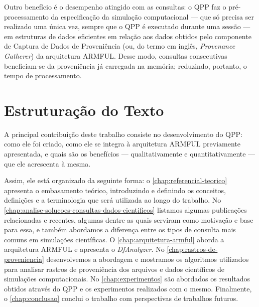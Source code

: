 Outro benefício é o desempenho atingido com as consultas: o QPP faz o pré-processamento da especificação da simulação computacional --- que só precisa ser realizado uma única vez, sempre que o QPP é executado durante uma sessão --- em estruturas de dados eficientes em relação aos dados obtidos pelo componente de Captura de Dados de Proveniência (ou, do termo em inglês, \textit{Provenance Gatherer}) da arquitetura ARMFUL. Desse modo, consultas consecutivas beneficiam-se da proveniência já carregada na memória; reduzindo, portanto, o tempo de processamento.

\section{Estruturação do Texto}

A principal contribuição deste trabalho consiste no desenvolvimento do QPP: como ele foi criado, como ele se integra à arquitetura ARMFUL previamente apresentada, e quais são os benefícios --- qualitativamente e quantitativamente --- que ele acrescenta à mesma.

Assim, ele está organizado da seguinte forma:
o \autoref{chap:referencial-teorico} apresenta o embasamento teórico, introduzindo e definindo os conceitos, definições e a terminologia que será utilizada ao longo do trabalho.
No \autoref{chap:analise-solucoes-consultas-dados-cientificos} listamos algumas publicações relacionadas e recentes, algumas dentre as quais serviram como motivação e base para essa, e também abordamos a diferença entre os tipos de consulta mais comuns em simulações científicas.
O \autoref{chap:arquitetura-armful} aborda a arquitetura ARMFUL e apresenta o \textit{DfAnalyzer}.
No \autoref{chap:rastros-de-proveniencia} desenvolvemos a abordagem e mostramos os algoritmos utilizados para analisar rastros de proveniência dos arquivos e dados científicos de simulações computacionais.
No \autoref{chap:experimentos} são abordados os resultados obtidos através do QPP e os experimentos realizados com o mesmo.
Finalmente, o \autoref{chap:conclusao} conclui o trabalho com perspectivas de trabalhos futuros.
